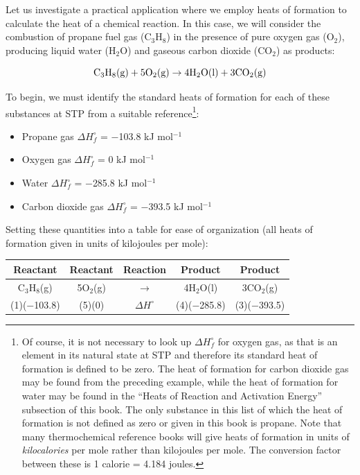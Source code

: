 \vskip 10pt

\filbreak

Let us investigate a practical application where we employ heats of formation to calculate the heat of a chemical reaction.  In this case, we will consider the combustion of propane fuel gas (C$_{3}$H$_{8}$) in the presence of pure oxygen gas (O$_{2}$), producing liquid water (H$_{2}$O) and gaseous carbon dioxide (CO$_{2}$) as products:

$$\hbox{C}_3\hbox{H}_8\hbox{(g)} + 5\hbox{O}_2\hbox{(g)} \to 4\hbox{H}_2\hbox{O}\hbox{(l)} + 3\hbox{CO}_2\hbox{(g)}$$  

To begin, we must identify the standard heats of formation for each of these substances at STP from a suitable reference\footnote{Of course, it is not necessary to look up $\Delta H_f^{\circ}$ for oxygen gas, as that is an element in its natural state at STP and therefore its standard heat of formation is defined to be zero.  The heat of formation for carbon dioxide gas may be found from the preceding example, while the heat of formation for water may be found in the ``Heats of Reaction and Activation Energy'' subsection of this book.  The only substance in this list of which the heat of formation is not defined as zero or given in this book is propane.  Note that many thermochemical reference books will give heats of formation in units of \textit{kilocalories} per mole rather than kilojoules per mole.  The conversion factor between these is 1 calorie = 4.184 joules.}:

\begin{itemize}
\item Propane gas $\Delta H_f^{\circ}$ = $-$103.8 kJ mol$^{-1}$ 
\item Oxygen gas $\Delta H_f^{\circ}$ = 0 kJ mol$^{-1}$
\item Water $\Delta H_f^{\circ}$ = $-$285.8 kJ mol$^{-1}$
\item Carbon dioxide gas $\Delta H_f^{\circ}$ = $-$393.5 kJ mol$^{-1}$ 
\end{itemize}

Setting these quantities into a table for ease of organization (all heats of formation given in units of kilojoules per mole):

\begin{center}
\begin{tabular}{| c | c | c | c | c |}
\hline 
\textbf{Reactant} & \textbf{Reactant} & \textbf{Reaction} & \textbf{Product} & \textbf{Product} \\[3pt] \hline
C$_{3}$H$_{8}$(g) & 5O$_{2}$(g) & $\to$ & 4H$_{2}$O(l) & 3CO$_{2}$(g) \\[3pt] \hline 
(1)($-$103.8) & (5)(0) & $\Delta H^{\circ}$ & (4)($-$285.8) & (3)($-$393.5) \\[3pt] \hline 
\end{tabular}
\end{center}

